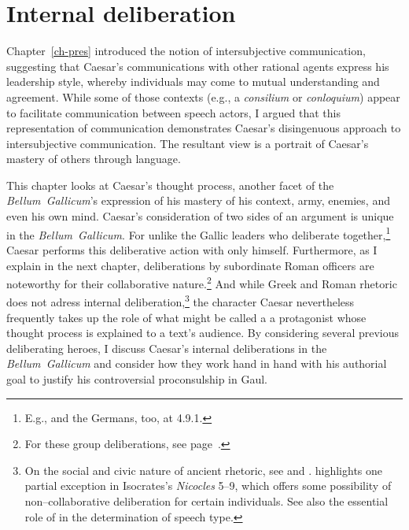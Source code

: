 \documentclass[12pt,letterpaper,oneside,final]{memoir}
\begin{document}


\chapter{Internal deliberation}%
\label{ch-delib}
Chapter~\ref{ch-pres} introduced the notion of intersubjective communication, suggesting that Caesar's communications with other rational agents express his leadership style, whereby individuals may come to mutual understanding and agreement. While some of those contexts (e.g., a \emph{consilium} or \emph{conloquium}) appear to facilitate communication between speech actors, I argued that this representation of communication demonstrates Caesar's disingenuous approach to intersubjective communication. The resultant view is a portrait of Caesar's mastery of others through language.

This chapter looks at Caesar's thought process, another facet of the \emph{Bellum~Gallicum}'s expression of his mastery of his context, army, enemies, and even his own mind. Caesar's consideration of two sides of an argument is unique in the \emph{Bellum~Gallicum}. For unlike the Gallic leaders who deliberate together,\footnote{E.g.,  and the Germans, too, at 4.9.1.} Caesar performs this deliberative action with only himself. Furthermore, as I explain in the next chapter, deliberations by subordinate Roman officers are noteworthy for their collaborative nature.\footnote{For these group deliberations, see page~\pageref{del-list}.} And while Greek and Roman rhetoric does not adress internal deliberation,\footnote{On the social and civic nature of ancient rhetoric, see \textcite[pp.~20--21, 45--46, and 81--85]{habinek2005} and \textcite[pp.~70--74 and 145--146]{connolly2007}. \textcite[81--85]{habinek2005} highlights one partial exception in Isocrates's \emph{Nicocles} 5--9, which offers some possibility of non--collaborative deliberation for certain individuals. See also the essential role of  in the determination of speech type.} the character Caesar nevertheless frequently takes up the role of what might be called a  a protagonist whose thought process is explained to a text's audience. By considering several previous deliberating heroes, I discuss Caesar's internal deliberations in the \emph{Bellum~Gallicum} and consider how they work hand in hand with his authorial goal to justify his controversial proconsulship in Gaul.
\end{document}
